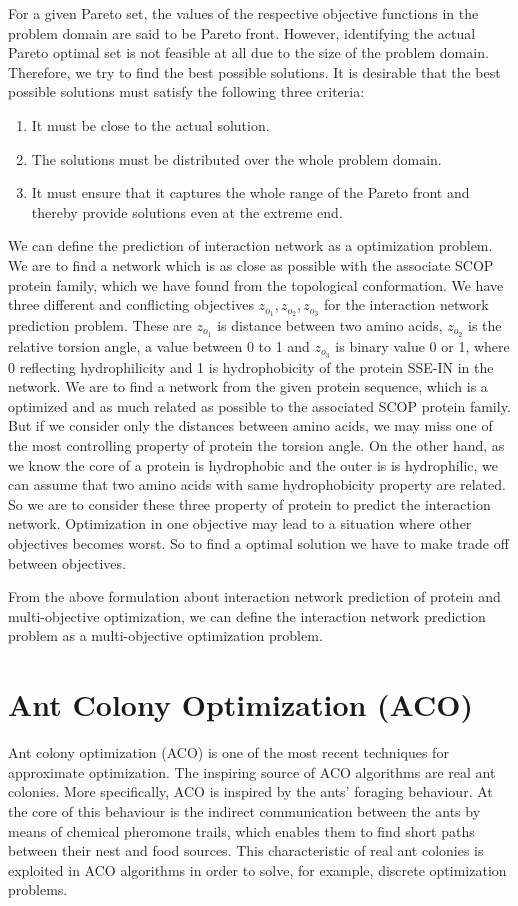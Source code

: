 For a given Pareto set, the values of the respective objective functions in the problem domain are said to be Pareto front. However, identifying the actual Pareto optimal set is not feasible at all due to the size of the problem domain. Therefore, we try to find the best possible solutions.  It is desirable that the best possible solutions must satisfy the following three criteria:
\begin{enumerate}
\item It must be close to the actual solution.
\item The solutions must be distributed over the whole problem domain.
\item It must ensure that it captures the whole range of the Pareto front and thereby provide solutions even at the extreme end.
\end{enumerate}

We can define the prediction of interaction network as a optimization problem. We are to find a network which is as close as possible with the associate SCOP protein family, which we have found from the topological conformation.
We have three different and conflicting objectives $z_{o_{1}}, z_{o_{2}}, z_{o_{3}}$ for the interaction network prediction problem. These are $z_{o_{1}}$ is distance between two amino acids, $z_{o_{2}}$ is the relative torsion angle, a value between 0 to 1 and $z_{o_{3}}$ is binary value 0 or 1, where 0 reflecting hydrophilicity and 1 is hydrophobicity of the protein SSE-IN in the network. We are to find a network from the given protein sequence, which is a optimized and as much related as possible to the associated SCOP protein family. But if we consider only the distances between amino acids, we may miss one of the most controlling property of protein the torsion angle. On the other hand, as we know the core of a protein is hydrophobic and the outer is is hydrophilic, we can assume that two amino acids with same hydrophobicity property are related. So we are to consider these three property of protein to predict the interaction network. Optimization in one objective may lead to a situation where other objectives becomes worst. So to find a optimal solution we have to make trade off between objectives.

From the above formulation about interaction network prediction of protein and multi-objective optimization, we can define the interaction network prediction problem as a multi-objective optimization problem.

\section { Ant Colony Optimization (ACO)}
\label{sec:ant_colony}
Ant colony optimization (ACO) is one of the most recent techniques for approximate optimization. The inspiring source of ACO algorithms are real ant colonies. More specifically, ACO is inspired by the ants' foraging behaviour. At the core of this behaviour is the indirect communication between the ants by means of chemical pheromone trails, which enables them to find short paths between their nest and food sources. This characteristic of real ant colonies is exploited in ACO algorithms in order to solve, for example, discrete optimization problems.

